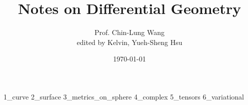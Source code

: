 \documentclass[12pt]{article}
\title{\textbf{Notes on Differential Geometry}}  %
\author{Prof. Chin-Lung Wang\\edited by Kelvin, Yueh-Sheng Hsu}      %
\date{\today}      %
\begin{document}
\maketitle                   %

{1_curve}
{2_surface}
{3_metrics_on_sphere}
{4_complex}
{5_tensors}
{6_variational}
\end{document}
